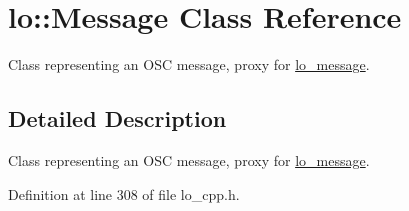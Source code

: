 \hypertarget{classlo_1_1Message}{\section{lo\+:\+:Message Class Reference}
\label{classlo_1_1Message}
}


Class representing an O\+S\+C message, proxy for \hyperlink{lo__types_8h_ad126083c98d941f00eb72d1690b38d63}{lo\+\_\+message}.  




\subsection{Detailed Description}
Class representing an O\+S\+C message, proxy for \hyperlink{lo__types_8h_ad126083c98d941f00eb72d1690b38d63}{lo\+\_\+message}. 

Definition at line 308 of file lo\+\_\+cpp.\+h.


